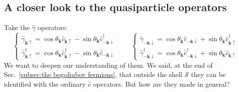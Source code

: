 \subsection{A closer look to the quasiparticle operators}\label{subsec:a closer look the quasiparticle operators}

Take the $\hat{\gamma}$ operators:
\[
	\begin{cases}
		\hat{\gamma}_{\mathbf{k}\uparrow} = \cos\theta_\mathbf{k} \hat{c}_{\mathbf{k}\uparrow} - \sin\theta_\mathbf{k} \hat{c}_{-\mathbf{k}\downarrow}^\dagger \\
		\hat{\gamma}_{\mathbf{k}\uparrow}^\dagger = \cos\theta_\mathbf{k} \hat{c}_{\mathbf{k}\uparrow}^\dagger - \sin\theta_\mathbf{k} \hat{c}_{-\mathbf{k}\downarrow}
	\end{cases}
	\qquad
	\begin{cases}
		\hat{\gamma}_{-\mathbf{k}\downarrow} = \cos\theta_\mathbf{k} \hat{c}_{-\mathbf{k}\downarrow} + \sin\theta_\mathbf{k} \hat{c}_{\mathbf{k}\uparrow}^\dagger \\
		\hat{\gamma}_{-\mathbf{k}\downarrow}^\dagger = \cos\theta_\mathbf{k} \hat{c}_{-\mathbf{k}\downarrow}^\dagger + \sin\theta_\mathbf{k} \hat{c}_{\mathbf{k}\uparrow}
	\end{cases}
\]
We want to deepen our understanding of them. We said, at the end of Sec.~\ref{subsec:the bogoliubov fermions}, that outside the shell $\mathcal{S}$ they can be identified with the ordinary $\hat{c}$ operators. But how are they made in general?

